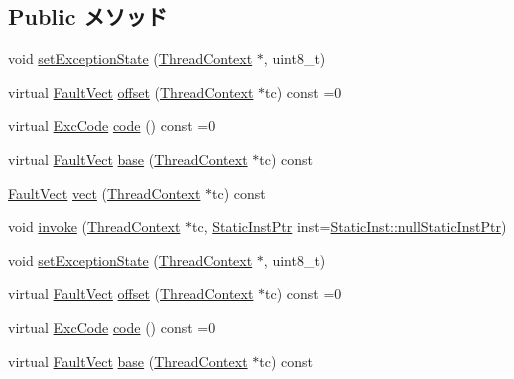 \subsection*{Public メソッド}
\begin{DoxyCompactItemize}
\item 
void \hyperlink{classMipsISA_1_1MipsFaultBase_a8254d2aa7a98db60b019665d8542442c}{setExceptionState} (\hyperlink{classThreadContext}{ThreadContext} $\ast$, uint8\_\-t)
\item 
virtual \hyperlink{classm5_1_1params_1_1Addr}{FaultVect} \hyperlink{classMipsISA_1_1MipsFaultBase_abc58e13990620c35409a5eaf15679c3c}{offset} (\hyperlink{classThreadContext}{ThreadContext} $\ast$tc) const =0
\item 
virtual \hyperlink{namespaceMipsISA_abcc8a7c57cd8becefbfd621dbff5ffd4}{ExcCode} \hyperlink{classMipsISA_1_1MipsFaultBase_a61bd3af5e2aa0d5447807e9fe98769be}{code} () const =0
\item 
virtual \hyperlink{classm5_1_1params_1_1Addr}{FaultVect} \hyperlink{classMipsISA_1_1MipsFaultBase_aeffc2acfc2e831414e517e76995fc6d5}{base} (\hyperlink{classThreadContext}{ThreadContext} $\ast$tc) const 
\item 
\hyperlink{classm5_1_1params_1_1Addr}{FaultVect} \hyperlink{classMipsISA_1_1MipsFaultBase_a1052109661a1cc9f7847b80b8b98450b}{vect} (\hyperlink{classThreadContext}{ThreadContext} $\ast$tc) const 
\item 
void \hyperlink{classMipsISA_1_1MipsFaultBase_a2bd783b42262278d41157d428e1f8d6f}{invoke} (\hyperlink{classThreadContext}{ThreadContext} $\ast$tc, \hyperlink{classRefCountingPtr}{StaticInstPtr} inst=\hyperlink{classStaticInst_aa793d9793af735f09096369fb17567b6}{StaticInst::nullStaticInstPtr})
\item 
void \hyperlink{classMipsISA_1_1MipsFaultBase_a8254d2aa7a98db60b019665d8542442c}{setExceptionState} (\hyperlink{classThreadContext}{ThreadContext} $\ast$, uint8\_\-t)
\item 
virtual \hyperlink{classm5_1_1params_1_1Addr}{FaultVect} \hyperlink{classMipsISA_1_1MipsFaultBase_abc58e13990620c35409a5eaf15679c3c}{offset} (\hyperlink{classThreadContext}{ThreadContext} $\ast$tc) const =0
\item 
virtual \hyperlink{namespaceMipsISA_abcc8a7c57cd8becefbfd621dbff5ffd4}{ExcCode} \hyperlink{classMipsISA_1_1MipsFaultBase_a61bd3af5e2aa0d5447807e9fe98769be}{code} () const =0
\item 
virtual \hyperlink{classm5_1_1params_1_1Addr}{FaultVect} \hyperlink{classMipsISA_1_1MipsFaultBase_aeffc2acfc2e831414e517e76995fc6d5}{base} (\hyperlink{classThreadContext}{ThreadContext} $\ast$tc) const 

\end{DoxyCompactItemize}
